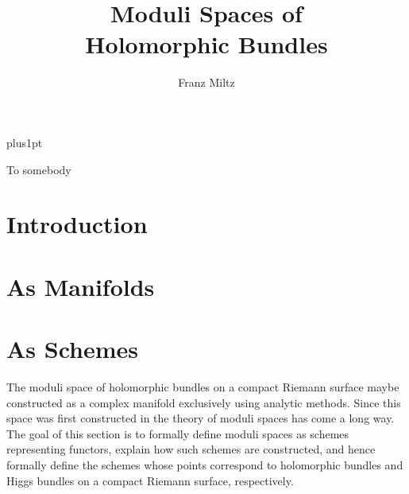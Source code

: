 \documentclass[12pt]{ociamthesis}  %
\title{Moduli Spaces of\\[1ex]Holomorphic Bundles}   %
\author{Franz Miltz}             %
\begin{document}
\baselineskip=18pt plus1pt

\setcounter{secnumdepth}{3}
\setcounter{tocdepth}{3}


\maketitle                  %
\begin{dedication}
  To somebody
\end{dedication}
\begin{acknowledgements}

\end{acknowledgements}
\begin{abstract}

\end{abstract}

\begin{romanpages}          %
  \tableofcontents            %
\end{romanpages}            %

\chapter{Introduction}

\chapter{As Manifolds}

\chapter{As Schemes}

The moduli space of holomorphic bundles on a compact Riemann
surface maybe constructed as a complex manifold exclusively
using analytic methods. Since this space was first constructed
in \missingcitation
the theory of moduli spaces has come a long way.
The goal of this section is to formally define moduli spaces
as schemes representing functors, explain how such schemes
are constructed, and hence formally define the schemes whose
points correspond to holomorphic bundles and Higgs bundles
on a compact Riemann surface, respectively.
\end{document}
